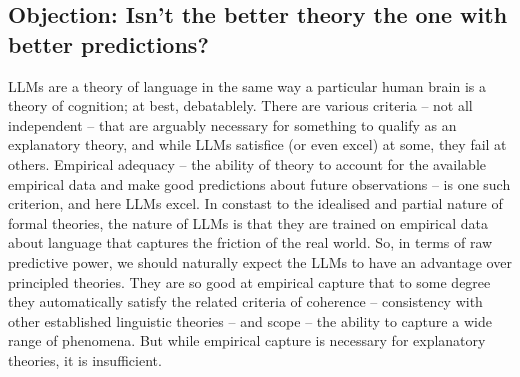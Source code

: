 \subsection{\textbf{Objection:} Isn't the better theory the one with better predictions?}

LLMs are a theory of language in the same way a particular human brain is a theory of cognition; at best, debatablely. There are various criteria -- not all independent -- that are arguably necessary for something to qualify as an explanatory theory, and while LLMs satisfice (or even excel) at some, they fail at others. Empirical adequacy -- the ability of theory to account for the available empirical data and make good predictions about future observations -- is one such criterion, and here LLMs excel. In constast to the idealised and partial nature of formal theories, the nature of LLMs is that they are trained on empirical data about language that captures the friction of the real world. So, in terms of raw predictive power, we should naturally expect the LLMs to have an advantage over principled theories. They are so good at empirical capture that to some degree they automatically satisfy the related criteria of coherence -- consistency with other established linguistic theories -- and scope -- the ability to capture a wide range of phenomena. But while empirical capture is necessary for explanatory theories, it is insufficient.\\

